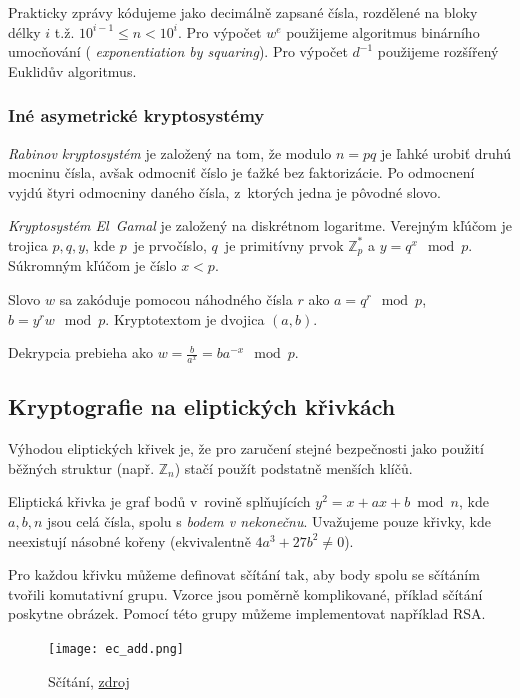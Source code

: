 Prakticky zprávy kódujeme jako decimálně zapsané čísla,
rozdělené na bloky délky $i$ t.ž. $10^{i-1} \leq n < 10^i$.
Pro výpočet $w^e$ použijeme algoritmus binárního umocňování ({\em
exponentiation by squaring}).
Pro výpočet $d^{-1}$ použijeme rozšířený Euklidův
algoritmus.


\subsubsection{Iné asymetrické kryptosystémy}
{\em Rabinov kryptosystém} je založený na tom, že modulo $n=pq$ je ľahké urobiť druhú
mocninu čísla, avšak odmocniť číslo je ťažké bez faktorizácie. Po odmocnení
vyjdú štyri odmocniny daného čísla, z~ktorých jedna je pôvodné slovo.

{\em Kryptosystém El~Gamal} je založený na diskrétnom logaritme. 
Verejným kľúčom je trojica $p,q,y$, kde $p$~je prvočíslo, $q$~je 
primitívny prvok $\mathbb{Z}^*_p$ a $y=q^x \mod p$. Súkromným kľúčom
je číslo $x < p$.

Slovo $w$ sa zakóduje pomocou náhodného čísla $r$ ako $a=q^r \mod p$,
$b=y^r w \mod p$. Kryptotextom je dvojica $(a,b)$.

Dekrypcia prebieha ako $w = \frac{b}{a^x}=ba^{-x}\mod p$.

\subsection{Kryptografie na eliptických křivkách}

Výhodou eliptických křivek je,
že pro zaručení stejné bezpečnosti jako použití běžných struktur (např.
$\mathbb{Z}_n$) stačí použít podstatně menších klíčů.

Eliptická křivka je graf bodů v~rovině splňujících
$y^2 = x + ax + b \bmod n$, kde $a,b,n$ jsou celá čísla,
spolu s {\em bodem v nekonečnu}. Uvažujeme pouze křivky, kde neexistují
násobné kořeny (ekvivalentně $4a^3 + 27b^2 \neq 0$).

Pro každou křivku můžeme definovat sčítání tak, aby body spolu se
sčítáním tvořili komutativní grupu. Vzorce jsou poměrně komplikované,
příklad sčítání poskytne obrázek. Pomocí této grupy můžeme implementovat
například RSA.

\begin{figure}[H]
    \centering
    \texttt{[image: ec\_add.png]}
    \caption{Sčítání, \href{https://www.certicom.com/content/certicom/en/21-elliptic-curve-addition-a-geometric-approach.html}{zdroj}}
\end{figure}

